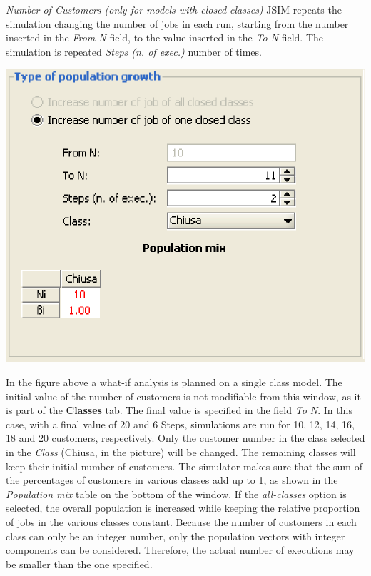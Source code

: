 \textit{Number of Customers (only for models with closed classes)}
JSIM repeats the simulation changing the number of jobs in each run,
starting from the number inserted in the \emph{From N} field, to the value inserted
in the \emph{To N} field. The simulation is repeated \emph{Steps (n. of exec.)} number of times.
\begin{center}
\includegraphics[scale=.5]{img/jsim/customers.eps}
\end{center}
In the figure above a what-if analysis is planned on a single class model.
The initial value of the number of customers is not modifiable from this window, as it is part of the \textbf{Classes} tab. The final value is specified in the field \emph{To N}. In this case, with a final value
of 20 and 6 Steps, simulations are run for 10, 12, 14, 16, 18 and 20 customers, respectively. Only the customer number in the class selected in the \emph{Class} (Chiusa, in the picture) will be changed. The remaining classes will keep their initial number of customers. The simulator makes sure that the sum of the percentages of customers in various classes add up to 1, as shown in the \emph{Population mix} table on the bottom of the window.
If the \emph{all-classes} option is selected, the overall population is increased while keeping the relative proportion of jobs in the various classes constant. Because the number of customers in each class can only be an integer number, only the population vectors with integer components can be considered. Therefore, the actual number of executions may be smaller than the one specified.\\\\
